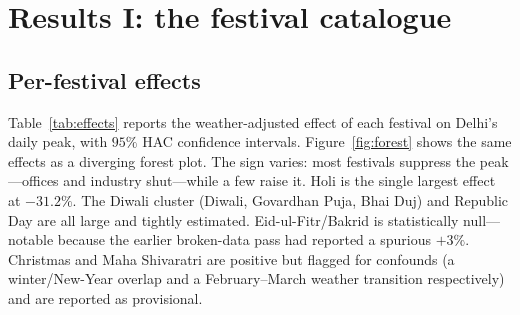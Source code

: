 \documentclass[11pt]{article}
\newcommand{\pct}{\%}
\begin{document}
\section{Results I: the festival catalogue}
\label{sec:results1}

\subsection{Per-festival effects}

Table~\ref{tab:effects} reports the weather-adjusted effect of each festival on
Delhi's daily peak, with $95\pct$ HAC confidence intervals.
Figure~\ref{fig:forest} shows the same effects as a diverging forest plot. The
sign varies: most festivals suppress the peak---offices and industry shut---while
a few raise it. Holi is the single largest effect at $-31.2\pct$. The Diwali
cluster (Diwali, Govardhan Puja, Bhai Duj) and Republic Day are all large and
tightly estimated. Eid-ul-Fitr/Bakrid is statistically null---notable because the
earlier broken-data pass had reported a spurious $+3\pct$. Christmas and Maha
Shivaratri are positive but flagged for confounds (a winter/New-Year overlap and a
February--March weather transition respectively) and are reported as provisional.
\end{document}
